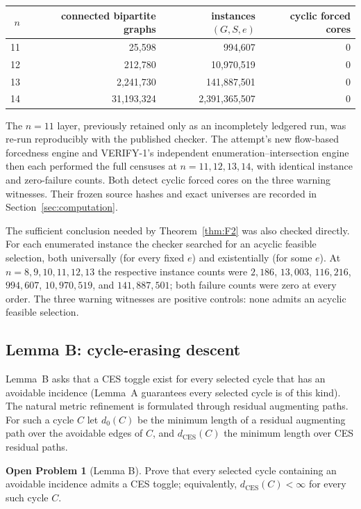 \documentclass[11pt]{article}
\theoremstyle{plain}
\theoremstyle{definition}
\newtheorem{problem}[theorem]{Open Problem}
\begin{document}
\begin{center}
\begin{tabular}{r|r|r|r}
$n$ & connected bipartite graphs & instances $(G,S,e)$ & cyclic forced cores\\
\hline
11 & 25,598 & 994,607 & 0\\
12 & 212,780 & 10,970,519 & 0\\
13 & 2,241,730 & 141,887,501 & 0\\
14 & 31,193,324 & 2,391,365,507 & 0\\
\end{tabular}
\end{center}
\medskip

The $n=11$ layer, previously retained only as an incompletely ledgered run, was
re-run reproducibly with the published checker.  The attempt's new flow-based
forcedness engine and VERIFY-1's independent enumeration--intersection engine
then each performed the full censuses at $n=11,12,13,14$, with identical
instance and zero-failure counts.  Both detect cyclic forced cores on the three
warning witnesses.  Their frozen source hashes and exact universes are recorded
in Section~\ref{sec:computation}.

The sufficient conclusion needed by Theorem~\ref{thm:F2} was also checked
directly.  For each enumerated instance the checker searched for an acyclic
feasible selection, both universally (for every fixed $e$) and existentially
(for some $e$).  At $n=8,9,10,11,12,13$ the respective instance counts were
$2,186$, $13,003$, $116,216$, $994,607$, $10,970,519$, and $141,887,501$;
both failure counts were zero at every order.  The three warning witnesses are
positive controls: none admits an acyclic feasible selection.

\subsection{Lemma B: cycle-erasing descent}

Lemma~B asks that a CES toggle exist for every selected cycle that has an
avoidable incidence (Lemma~A guarantees every selected cycle is of this kind).
The natural metric refinement is formulated through residual augmenting paths.
For such a cycle $C$ let $d_0(C)$ be the minimum length of a residual augmenting
path over the avoidable edges of $C$, and $d_{\mathrm{CES}}(C)$ the minimum length
over CES residual paths.

\begin{problem}[Lemma B]\label{prob:B}
Prove that every selected cycle containing an avoidable incidence admits a CES
toggle; equivalently, $d_{\mathrm{CES}}(C)<\infty$ for every such cycle $C$.
\end{problem}
\end{document}
